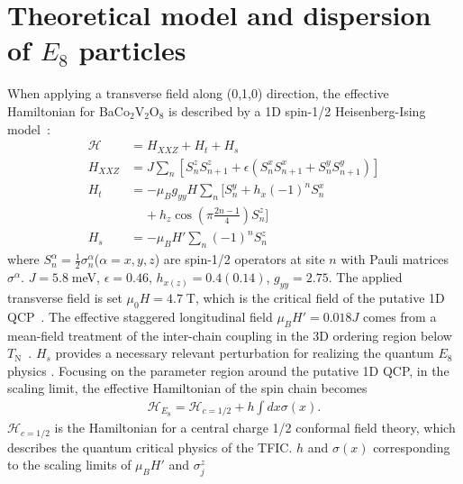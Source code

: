 \documentclass[aps,prl,twocolumn,superscriptaddress,groupedaddress]{revtex4}
\begin{document}

\section{Theoretical model and dispersion of $E_8$ particles}

When applying a transverse field along (0,1,0) direction, the effective Hamiltonian for BaCo$_2$V$_2$O$_8$ is described by a 1D spin-1/2 Heisenberg-Ising model~\cite{Kimura_2013,Weiqiang2019,Zou_2021,Zou_2019}:
\begin{equation}
\begin{aligned}
 \mathcal{H} &=H_{XXZ}+H_{t}+H_{s}\\
H_{XXZ}&= J\sum_{n}[S^z_{n}S^z_{n+1}+\epsilon(S^x_{n}S^x_{n+1}+S^y_{n}S^y_{n+1})]\\
H_{t}&=-\mu_{B}g_{yy}H\sum_{n}[S^y_{n}+h_{x}(-1)^{n}S^{x}_{n}\\
& \;\;\;\; +h_{z}\cos(\pi\frac{2n-1}{4})S^z_{n}]\\
H_{s}&=-\mu_{B}H'\sum_{n}(-1)^n S^{z}_{n}
\label{eq:Hamil}
\end{aligned}
\end{equation}
where $S^{\alpha}_{n} = \frac{1}{2}\sigma^{\alpha}_{n}$($\alpha=x,y,z$) are spin-1/2 operators at site $n$ with Pauli matrices $\sigma^{\alpha}$. $J=5.8\;$meV, $\epsilon=0.46$, $h_{x(z)}=0.4(0.14)$, $g_{yy}=2.75$. The applied transverse field is set $\mu_{0}H=4.7\;$T, which is the critical field of the putative 1D QCP~\cite{Zou_2019,Zou_2021}. The effective staggered longitudinal field $\mu_{B}H'=0.018J$ comes from a mean-field treatment of the inter-chain coupling in the 3D ordering region below $T_{\mathrm{N}}$~\cite{Faure:2017iup,Zou_2021}.
 $H_s$ provides a necessary relevant perturbation for realizing the quantum $E_8$ physics \cite{Zou_2021}. Focusing on the parameter region around the putative 1D QCP, in the scaling limit, the effective Hamiltonian of the spin chain becomes~\cite{DELFINO1995724,Zou_2021,xiao_2021}
\begin{align}
\mathcal{H}_{E_8}=\mathcal{H}_{c=1/2}+h\int dx \sigma(x).
\label{eq:E8Hamil}
\end{align}
$\mathcal{H}_{c=1/2}$ is the Hamiltonian for a central charge 1/2 conformal
field theory, which describes the quantum critical physics of the TFIC.
$h$ and $\sigma (x)$ corresponding to the scaling limits of $\mu_{B}H'$ and $\sigma_j^z$
\end{document}
